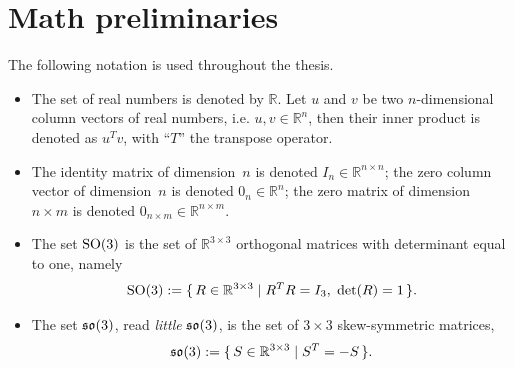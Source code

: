
\section{Math preliminaries}
The following notation is used throughout the thesis.
\begin{itemize}

\item
The set of real numbers is denoted by $\mathbb{R}$. 
Let $u$ and $v$ be two $n$-dimensional column vectors of real numbers, i.e. $u,v \in \mathbb{R}^n$, 
then their inner product is denoted as $u^T v$, with ``$T$'' the transpose operator. 

\item
The identity matrix of dimension~$n$ is denoted
$I_n \in \mathbb{R}^{n \times n}$; the zero column vector of dimension~$n$ is denoted $0_n \in \mathbb{R}^n$; the zero matrix of dimension~$n \times m$ is denoted $0_{n \times m} \in \mathbb{R}^{n \times m}$.

\item
The set $\textrm{SO}(3)$ is
the set of $\mathbb{R}^{3 \times 3}$ orthogonal matrices with determinant equal to one, namely
\begin{align}
\textrm{SO}(3) :=  \{\, R \in \mathbb{R}^{3 \times 3} \mid R^T R = I_3 , \hspace{0.3em} \operatorname{det}(R) = 1 \,\}.
\end{align}

\item The set $\mathfrak{so}(3)$, read {\em little} $\mathfrak{so}(3)$, is
the set of $3 \times 3$ skew-symmetric matrices, 
\begin{align}
\mathfrak{so}(3) :=  \{\, S \in \mathbb{R}^{3 \times 3}  \mid S^T = -S \,\}.
\end{align}


\end{itemize}
